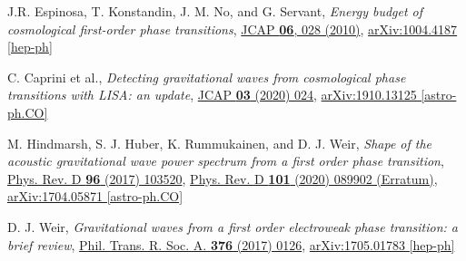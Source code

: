 \documentclass[10pt]{article}
\begin{document}
\begin{thebibliography}{9}

    J.R. Espinosa, T. Konstandin, J. M. No, and G. Servant,
    \textit{Energy budget of cosmological first-order phase transitions},
    \href{https://doi.org/10.1088/1475-7516/2010/06/028}{JCAP \textbf{06}, 028 (2010)},
    \href{https://doi.org/10.48550/arXiv.1004.4187}{arXiv:1004.4187 [hep-ph]}

    C. Caprini et al.,
    \textit{Detecting gravitational waves from cosmological phase transitions with LISA: an update},
    \href{https://doi.org/10.1088/1475-7516/2020/03/024}{JCAP \textbf{03} (2020) 024},
    \href{https://doi.org/10.48550/arXiv.1910.13125}{arXiv:1910.13125 [astro-ph.CO]}

    M. Hindmarsh, S. J. Huber, K. Rummukainen, and D. J. Weir,
    \textit{Shape of the acoustic gravitational wave power spectrum from a first order phase transition},
    \href{https://doi.org/10.1103/PhysRevD.96.103520}{Phys. Rev. D \textbf{96} (2017) 103520},
    \href{https://doi.org/10.1103/PhysRevD.101.089902}{Phys. Rev. D \textbf{101} (2020) 089902 (Erratum)},
    \href{https://doi.org/10.48550/arXiv.1704.05871}{arXiv:1704.05871 [astro-ph.CO]}

    D. J. Weir,
    \textit{Gravitational waves from a first order electroweak phase transition: a brief review},
    \href{https://doi.org/10.1098/rsta.2017.0126}{Phil. Trans. R. Soc. A. \textbf{376} (2017) 0126},
    \href{https://doi.org/10.48550/arXiv.1705.01783}{arXiv:1705.01783 [hep-ph]}

\end{thebibliography}
\end{document}
